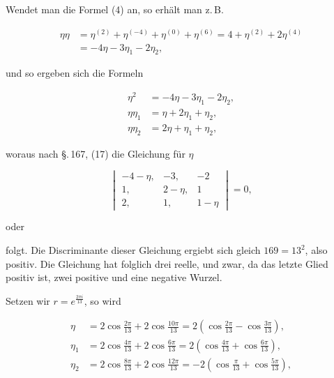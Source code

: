 
Wendet man die Formel (4) an, so erhält man z.\,B.

\[
\begin{aligned}
\eta\eta &= \eta^{(2)} + \eta^{(-4)} + \eta^{(0)} + \eta^{(6)} = 4 + \eta^{(2)} + 2\eta^{(4)}\\
&= -4\eta - 3\eta_1 - 2\eta_2,
\end{aligned}
\]

und so ergeben sich die Formeln

\[
\begin{aligned}
\eta^2 &= -4\eta - 3\eta_1 - 2\eta_2,\\
\eta\eta_1 &= \eta + 2\eta_1 + \eta_2,\\
\eta\eta_2 &= 2\eta + \eta_1 + \eta_2,
\end{aligned}
\]

woraus nach \S.\,167, (17) die Gleichung für $\eta$

\[
\begin{vmatrix}
-4-\eta, & -3, & -2\\
1, & 2-\eta, & 1\\
2, & 1, & 1-\eta
\end{vmatrix} = 0,
\]

oder


folgt. Die Discriminante dieser Gleichung ergiebt sich gleich
$169 = 13^2$, also positiv. Die Gleichung hat folglich drei reelle,
und zwar, da das letzte Glied positiv ist, zwei positive und eine
negative Wurzel.

Setzen wir $r = e^{\frac{2\pi i}{13}}$, so wird

\[
\begin{aligned}
\eta &= 2\cos\frac{2\pi}{13} + 2\cos\frac{10\pi}{13} = 2\left(\cos\frac{2\pi}{13} - \cos\frac{3\pi}{13}\right),\\
\eta_1 &= 2\cos\frac{4\pi}{13} + 2\cos\frac{6\pi}{13} = 2\left(\cos\frac{4\pi}{13} + \cos\frac{6\pi}{13}\right),\\
\eta_2 &= 2\cos\frac{8\pi}{13} + 2\cos\frac{12\pi}{13} = -2\left(\cos\frac{\pi}{13} + \cos\frac{5\pi}{13}\right),
\end{aligned}
\]

